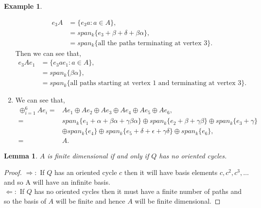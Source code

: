 \documentclass[11.5pt, twoside, a4paper, titlepage]{report}
\theoremstyle{definition}
\newtheorem{eg}[mydef]{Example}
\theoremstyle{plain}
\newtheorem{lem}[mydef]{Lemma}
\begin{document}
\begin{eg}
\begin{enumerate}
\begin{align*}
e_3A&=\{e_3a: a\in A\},\\
&=span_k\{e_3+\beta+\delta+\beta\alpha\},\\
&=span_k\{ \text{all the paths terminating at vertex 3}\}.
\end{align*}
Then we can see that, 
\begin{align*}
e_3Ae_1&=\{e_3ae_1: a \in A\},\\
&= span_k\{\beta\alpha\},\\
&=span_k\{\text{all paths starting at vertex 1 and terminating at vertex 3}\}.
\end{align*}
\item We can see that, 
\begin{align*}
\oplus^6_{i=1}Ae_i=&Ae_1 \oplus Ae_2 \oplus Ae_3 \oplus Ae_4 \oplus Ae_5 \oplus Ae_6, \\
=&span_k\{e_1 + \alpha + \beta\alpha + \gamma\beta\alpha\} \oplus span_k\{e_2 + \beta +\gamma\beta\} \oplus span_k\{e_3 + \gamma\} \\
&\oplus span_k\{e_4\} \oplus span_k\{e_5 + \delta + \epsilon + \gamma\delta\} \oplus span_k\{e_6\}, \\
=& A.
\end{align*}
\end{enumerate}
\end{eg}

\begin{lem}
$A$ is finite dimensional if and only if $Q$ has no oriented cycles.
\end{lem}
\begin{proof}
$\Rightarrow:$ If $Q$ has an oriented cycle $c$ then it will have basis elements $c,c^2,c^3, \dots$ and so A will have an infinite basis.\\
$\Leftarrow:$ If $Q$ has no oriented cycles then it must have a finite number of paths and so the basis of $A$ will be finite and hence $A$ will be finite dimensional.
\end{proof}
\end{document}
